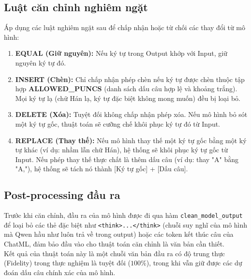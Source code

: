 \subsection{Luật căn chỉnh nghiêm ngặt}
Áp dụng các luật nghiêm ngặt sau để chấp nhận hoặc từ chối các thay đổi từ mô hình:
\begin{enumerate}
    \item \textbf{EQUAL (Giữ nguyên):} Nếu ký tự trong Output khớp với Input, giữ nguyên ký tự đó.
    \item \textbf{INSERT (Chèn):} Chỉ chấp nhận phép chèn nếu ký tự được chèn thuộc tập hợp \textbf{ALLOWED\_PUNCS} (danh sách dấu câu hợp lệ và khoảng trắng). Mọi ký tự lạ (chữ Hán lạ, ký tự đặc biệt không mong muốn) đều bị loại bỏ.
    \item \textbf{DELETE (Xóa):} Tuyệt đối không chấp nhận phép xóa. Nếu mô hình bỏ sót một ký tự gốc, thuật toán sẽ cưỡng chế khôi phục ký tự đó từ Input.
    \item \textbf{REPLACE (Thay thế):} Nếu mô hình thay thế một ký tự gốc bằng một ký tự khác (ví dụ: nhầm lẫn chữ Hán), hệ thống sẽ khôi phục ký tự gốc từ Input. Nếu phép thay thế thực chất là thêm dấu câu (ví dụ: thay "A" bằng "A,"), hệ thống sẽ tách nó thành [Ký tự gốc] + [Dấu câu].
\end{enumerate}

\subsection{Post-processing đầu ra}
Trước khi căn chỉnh, đầu ra của mô hình được đi qua hàm \texttt{clean_model_output} để loại bỏ các thẻ đặc biệt như \texttt{<think>...</think>} (chuỗi suy nghĩ của mô hình mà Qwen hầu như luôn trả về trong output) hoặc các token kết thúc câu của ChatML, đảm bảo đầu vào cho thuật toán căn chỉnh là văn bản cần thiết.
\\
Kết quả của thuật toán này là một chuỗi văn bản đầu ra có độ trung thực (Fidelity) trong thực nghiệm là tuyệt đối ($100\%$), trong khi vẫn giữ được các dự đoán dấu câu chính xác của mô hình.